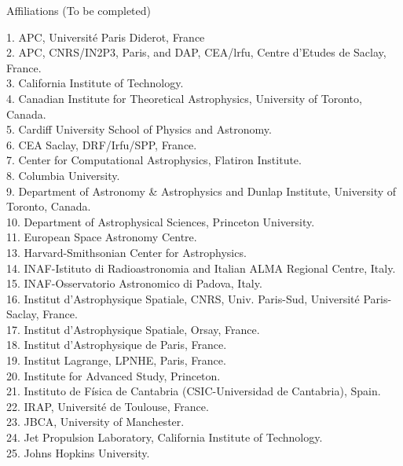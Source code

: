 \documentclass[PICOReport.tex]{subfiles}
\begin{document}
\newpage
\Large  {\centerline {Affiliations  (To be completed)}}


\begin{multicols}{2}
\raggedright 
\scriptsize {
1. APC, Universit\'e Paris Diderot, France  \\ 
2. APC, CNRS/IN2P3, Paris, and DAP, CEA/lrfu, Centre d'Etudes de Saclay, France.  \\
3. California Institute of Technology.  \\
4. Canadian Institute for Theoretical Astrophysics, University of Toronto, Canada.  \\
5. Cardiff University School of Physics and Astronomy.  \\
6. CEA Saclay, DRF/Irfu/SPP, France.  \\
7. Center for Computational Astrophysics, Flatiron Institute.  \\
8. Columbia University.  \\
9. Department of Astronomy \& Astrophysics and Dunlap Institute, University of Toronto, Canada.  \\
10. Department of Astrophysical Sciences, Princeton University.  \\
11. European Space Astronomy Centre.  \\
13. Harvard-Smithsonian Center for Astrophysics.  \\
14. INAF-Istituto di Radioastronomia and Italian ALMA Regional Centre, Italy.  \\
15. INAF-Osservatorio Astronomico di Padova, Italy.  \\
16. Institut d'Astrophysique Spatiale, CNRS, Univ. Paris-Sud, Universit\'e Paris-Saclay, France.  \\
17. Institut d'Astrophysique Spatiale, Orsay, France.  \\
18. Institut d'Astrophysique de Paris, France.  \\
19. Institut Lagrange, LPNHE,  Paris, France.  \\
20. Institute for Advanced Study, Princeton.  \\
21. Instituto de F\'isica de Cantabria (CSIC-Universidad de Cantabria), Spain.  \\
22. IRAP, Universit\'e de Toulouse, France.  \\
23. JBCA, University of Manchester.  \\
24. Jet Propulsion Laboratory, California Institute of Technology.  \\
25. Johns Hopkins University.  \\
}
\end{multicols}
\end{document}
